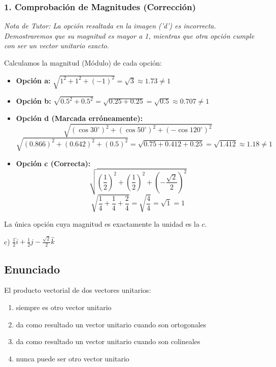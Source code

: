 \documentclass[12pt, a4paper]{article}
\begin{document}
\subsubsection*{1. Comprobación de Magnitudes (Corrección)}
\textit{Nota de Tutor: La opción resaltada en la imagen ('d') es incorrecta. Demostraremos que su magnitud es mayor a 1, mientras que otra opción cumple con ser un vector unitario exacto.}

Calculamos la magnitud (Módulo) de cada opción:
\begin{itemize}
    \item \textbf{Opción a:} $\sqrt{1^2 + 1^2 + (-1)^2} = \sqrt{3} \approx 1.73 \neq 1$
    \item \textbf{Opción b:} $\sqrt{0.5^2 + 0.5^2} = \sqrt{0.25 + 0.25} = \sqrt{0.5} \approx 0.707 \neq 1$
    \item \textbf{Opción d (Marcada erróneamente):} 
    $$ \sqrt{(\cos 30^\circ)^2 + (\cos 50^\circ)^2 + (-\cos 120^\circ)^2} $$
    $$ \sqrt{(0.866)^2 + (0.642)^2 + (0.5)^2} = \sqrt{0.75 + 0.412 + 0.25} = \sqrt{1.412} \approx 1.18 \neq 1 $$
    \item \textbf{Opción c (Correcta):}
    $$ \sqrt{\left(\frac{1}{2}\right)^2 + \left(\frac{1}{2}\right)^2 + \left(-\frac{\sqrt{2}}{2}\right)^2} $$
    $$ \sqrt{\frac{1}{4} + \frac{1}{4} + \frac{2}{4}} = \sqrt{\frac{4}{4}} = \sqrt{1} = 1 $$
\end{itemize}
La única opción cuya magnitud es exactamente la unidad es la $c$.

\begin{tcolorbox}[colback=green!5!white, colframe=green!50!black, title=Respuesta Final]
\centering \Large c) $\frac{1}{2}\hat{i} + \frac{1}{2}\hat{j} - \frac{\sqrt{2}}{2}\hat{k}$
\end{tcolorbox}

\newpage


\subsection*{Enunciado}
El producto vectorial de dos vectores unitarios:
\begin{enumerate}[label=\alph*)]
    \item siempre es otro vector unitario
    \item da como resultado un vector unitario cuando son ortogonales
    \item da como resultado un vector unitario cuando son colineales
    \item nunca puede ser otro vector unitario
\end{enumerate}
\end{document}

